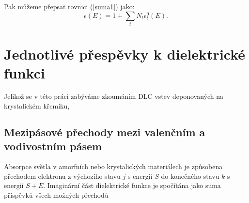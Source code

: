 Pak můžeme přepsat rovnici (\ref{suma1}) jako:
\begin{equation}
\epsilon (E) = 1 + \sum_t N_t \epsilon_t^0(E) \mathrm{.}
\end{equation}




\section{Jednotlivé přespěvky k dielektrické funkci}
Jelikož se v této práci zabýváme zkoumáním DLC vstev deponovaných na krystalickém křemíku, 




\subsection{Mezipásové přechody mezi valenčním a vodivostním pásem}

Absorpce světla v amorfních nebo krystalických materiálech je způsobena přechodem elektronu z výchozího stavu $j$ s energií $S$ do konečného stavu $k$ s energií $S + E$. Imaginární část dielektrické funkce je spočítána jako suma příspěvků všech možných přechodů

